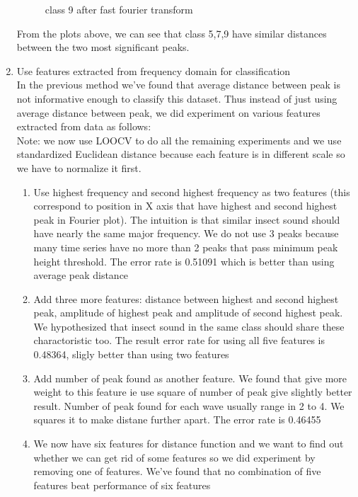 \begin{enumerate}
\begin{figure}[H]
\caption{class 9 after fast fourier transform}
\end{figure}
From the plots above, we can see that class 5,7,9 have similar distances between the two most significant peaks.\\

\item Use features extracted from frequency domain for classification\\
In the previous method we've found that average distance between peak is not informative enough to classify this dataset. Thus instead of just using average distance between peak, we did experiment on various features extracted from data as follows:\\
Note: we now use LOOCV to do all the remaining experiments and we use standardized Euclidean distance because each feature is in different scale so we have to normalize it first.
\begin{enumerate}
\item Use highest frequency and second highest frequency as two features (this correspond to position in X axis that have highest and second highest peak in Fourier plot). The intuition is that similar insect sound should have nearly the same major frequency. We do not use 3 peaks because many time series have no more than 2 peaks that pass minimum peak height threshold. The error rate is 0.51091 which is better than using average peak distance\\ 
\item Add three more features: distance between highest and second highest peak, amplitude of highest peak and amplitude of second highest peak. We hypothesized that insect sound in the same class should share these charactoristic too. The result error rate for using all five features is 0.48364, sligly better than using two features\\
\item Add number of peak found as another feature. We found that give more weight to this feature ie use square of number of peak give slightly better result. Number of peak found for each wave usually range in 2 to 4. We squares it to make distane further apart. The error rate is 0.46455\\
\item We now have six features for distance function and we want to find out whether we can get rid of some features so we did experiment by removing one of features. We've found that no combination of five features beat performance of six features\\

\end{enumerate}
\end{enumerate}
